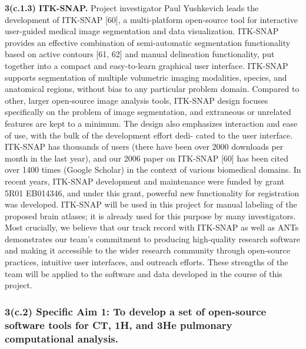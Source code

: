 \documentclass[11pt,]{article}
\begin{document}
\textbf{3(c.1.3) ITK-SNAP.} Project investigator Paul Yushkevich leads
the development of ITK-SNAP {[}60{]}, a multi-platform open-source tool
for interactive user-guided medical image segmentation and data
visualization. ITK-SNAP provides an effective combination of
semi-automatic segmentation functionality based on active contours
{[}61, 62{]} and manual delineation functionality, put together into a
compact and easy-to-learn graphical user interface. ITK-SNAP supports
segmentation of multiple volumetric imaging modalities, species, and
anatomical regions, without bias to any particular problem domain.
Compared to other, larger open-source image analysis tools, ITK-SNAP
design focuses specifically on the problem of image segmentation, and
extraneous or unrelated features are kept to a minimum. The design also
emphasizes interaction and ease of use, with the bulk of the development
effort dedi- cated to the user interface. ITK-SNAP has thousands of
users (there have been over 2000 downloads per month in the last year),
and our 2006 paper on ITK-SNAP {[}60{]} has been cited over 1400 times
(Google Scholar) in the context of various biomedical domains. In recent
years, ITK-SNAP development and maintenance were funded by grant 5R01
EB014346, and under this grant, powerful new functionality for
registration was developed. ITK-SNAP will be used in this project for
manual labeling of the proposed brain atlases; it is already used for
this purpose by many investigators. Most crucially, we believe that our
track record with ITK-SNAP as well as ANTs demonstrates our team's
commitment to producing high-quality research software and making it
accessible to the wider research community through open-source
practices, intuitive user interfaces, and outreach efforts. These
strengths of the team will be applied to the software and data developed
in the course of this project.

\subsubsection{3(c.2) \textbf{Specific Aim 1:} To develop a set of
open-source software tools for CT, 1H, and 3He pulmonary computational
analysis.}\label{c.2-specific-aim-1-to-develop-a-set-of-open-source-software-tools-for-ct-1h-and-3he-pulmonary-computational-analysis.}
\end{document}
